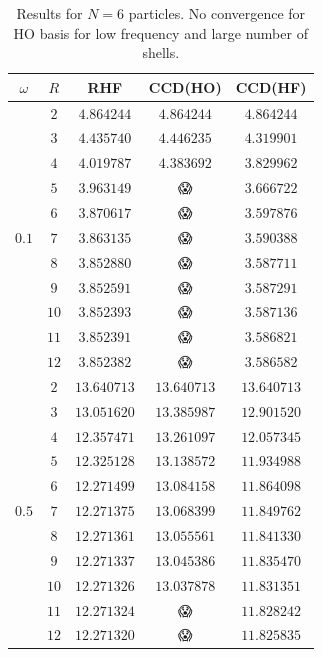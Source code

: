 \documentclass[
    a4paper, aps, twocolumn, floatfix, superscriptaddress,
    nofootinbib]{revtex4-1}
\newcommand{\nan}{\DejaSans 😱}
\newcommand{\1}{\mathds{1}}
\begin{document}
        \begin{table}
            \centering
            \caption{Results for $N = 6$ particles. No convergence for HO
                basis for low frequency and large number of shells.}
            \begin{ruledtabular}
                \begin{tabular}{c|c|ccc}
                    $\omega$ & $R$ & RHF & CCD(HO) & CCD(HF) \\ \hline
                             &  $2$  & $4.864244$ & $4.864244$ & $4.864244$ \\
                             &  $3$  & $4.435740$ & $4.446235$ & $4.319901$ \\
                             &  $4$  & $4.019787$ & $4.383692$ & $3.829962$ \\
                             &  $5$  & $3.963149$ & \nan & $3.666722$ \\
                             &  $6$  & $3.870617$ & \nan & $3.597876$ \\
                      $0.1$  &  $7$  & $3.863135$ & \nan & $3.590388$ \\
                             &  $8$  & $3.852880$ & \nan & $3.587711$ \\
                             &  $9$  & $3.852591$ & \nan & $3.587291$ \\
                             &  $10$ & $3.852393$ & \nan & $3.587136$ \\
                             &  $11$ & $3.852391$ & \nan & $3.586821$ \\
                             &  $12$ & $3.852382$ & \nan & $3.586582$ \\ \hline

                             &  $2$  & $13.640713$ & $13.640713$ & $13.640713$ \\
                             &  $3$  & $13.051620$ & $13.385987$ & $12.901520$ \\
                             &  $4$  & $12.357471$ & $13.261097$ & $12.057345$ \\
                             &  $5$  & $12.325128$ & $13.138572$ & $11.934988$ \\
                             &  $6$  & $12.271499$ & $13.084158$ & $11.864098$ \\
                      $0.5$  &  $7$  & $12.271375$ & $13.068399$ & $11.849762$ \\
                             &  $8$  & $12.271361$ & $13.055561$ & $11.841330$ \\
                             &  $9$  & $12.271337$ & $13.045386$ & $11.835470$ \\
                             &  $10$ & $12.271326$ & $13.037878$ & $11.831351$ \\
                             &  $11$ & $12.271324$ & \nan & $11.828242$ \\
                             &  $12$ & $12.271320$ & \nan & $11.825835$ \\ \hline


\end{tabular}
\end{ruledtabular}
\end{table}
\end{document}
